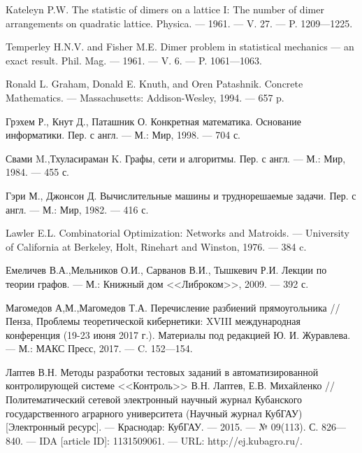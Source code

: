 \begin{thebibliography}{11}
Kateleyn P.W. The statistic of dimers on a lattice I: The number of dimer arrangements on quadratic lattice.
Physica. --- 1961. --- V. 27. --- P. 1209---1225.



Temperley H.N.V. and Fisher M.E.
Dimer problem in statistical mechanics --- an exact result.
 Phil. Mag. --- 1961. --- V. 6. --- P. 1061---1063.
%


Ronald L. Graham, Donald E. Knuth, and Oren Patashnik.
Concrete Mathematics. --- Massachusetts: Addison-Wesley, 1994. --- 657 p.



Грэхем Р., Кнут Д., Паташник О.
Конкретная математика. Основание информатики. Пер. с англ. ---
М.: Мир, 1998. --- 704 с.
%



Свами M.,Тхуласираман K. Графы, сети и алгоритмы. Пер. с англ. --- М.: Мир, 1984. --- 455 с.



Гэри М., Джонсон Д. Вычислительные машины и труднорешаемые задачи. Пер. с англ. --- М.: Мир, 1982. --- 416 с.



Lawler E.L. Combinatorial Optimization: Networks and Matroids. ---
University of California at Berkeley, Holt, Rinehart and Winston,  1976. --- 384 c.



Емеличев В.А.,Мельников О.И., Сарванов В.И., Тышкевич Р.И.
Лекции по теории графов. --- М.: Книжный дом <<Либроком>>, 2009. --- 392 с.



Магомедов А,М.,Магомедов Т.А.
Перечисление разбиений прямоугольника // Пенза, Проблемы теоретической кибернетики: XVIII международная конференция (19-23 июня 2017 г.). Материалы под редакцией Ю. И. Журавлева. --- М.: МАКС Пресс, 2017. --- C. 152---154.











Лаптев В.Н. Методы разработки тестовых заданий в автоматизированной контролирующей системе <<Контроль>> В.Н. Лаптев, Е.В. Михайленко // Политематический сетевой электронный научный журнал Кубанского государственного аграрного университета (Научный журнал КубГАУ) [Электронный ресурс]. --- Краснодар: КубГАУ. --- 2015. --- № 09(113). С. 826---840. --- IDA [article ID]: 1131509061. --- URL: http://ej.kubagro.ru/.




\end{thebibliography}
